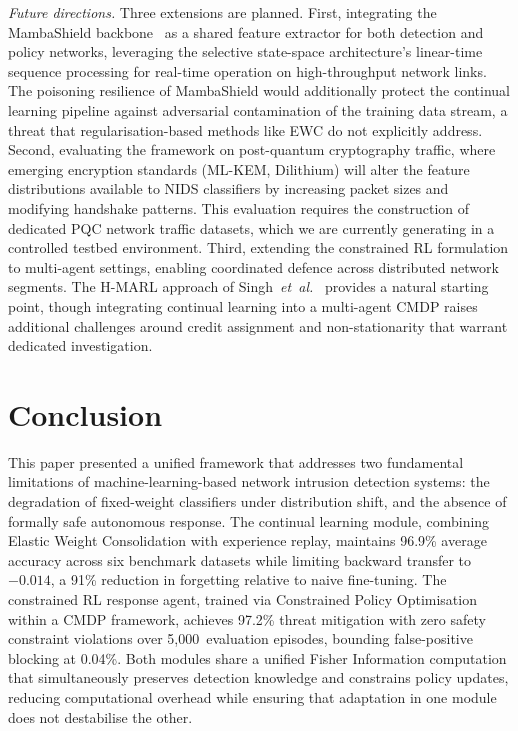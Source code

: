 \documentclass[journal]{IEEEtran}
\theoremstyle{definition}
\theoremstyle{remark}
\begin{document}
\textit{Future directions.} Three extensions are planned. First, integrating the MambaShield backbone~\cite{anaedevha2026mambashield} as a shared feature extractor for both detection and policy networks, leveraging the selective state-space architecture's linear-time sequence processing for real-time operation on high-throughput network links. The poisoning resilience of MambaShield would additionally protect the continual learning pipeline against adversarial contamination of the training data stream, a threat that regularisation-based methods like EWC do not explicitly address. Second, evaluating the framework on post-quantum cryptography traffic, where emerging encryption standards (ML-KEM, Dilithium) will alter the feature distributions available to NIDS classifiers by increasing packet sizes and modifying handshake patterns. This evaluation requires the construction of dedicated PQC network traffic datasets, which we are currently generating in a controlled testbed environment. Third, extending the constrained RL formulation to multi-agent settings, enabling coordinated defence across distributed network segments. The H-MARL approach of Singh~\textit{et~al.}~\cite{singh2025hmarl} provides a natural starting point, though integrating continual learning into a multi-agent CMDP raises additional challenges around credit assignment and non-stationarity that warrant dedicated investigation.

\section{Conclusion}
\label{sec:conclusion}

This paper presented a unified framework that addresses two fundamental limitations of machine-learning-based network intrusion detection systems: the degradation of fixed-weight classifiers under distribution shift, and the absence of formally safe autonomous response. The continual learning module, combining Elastic Weight Consolidation with experience replay, maintains 96.9\% average accuracy across six benchmark datasets while limiting backward transfer to $-0.014$, a 91\% reduction in forgetting relative to naive fine-tuning. The constrained RL response agent, trained via Constrained Policy Optimisation within a CMDP framework, achieves 97.2\% threat mitigation with zero safety constraint violations over 5{,}000~evaluation episodes, bounding false-positive blocking at 0.04\%. Both modules share a unified Fisher Information computation that simultaneously preserves detection knowledge and constrains policy updates, reducing computational overhead while ensuring that adaptation in one module does not destabilise the other.
\end{document}
